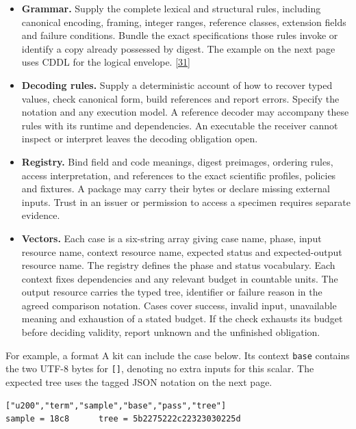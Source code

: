 \documentclass[11pt,a4paper]{article}
\newcommand{\src}[1]{\hyperlink{ref#1}{[#1]}}
\begin{document}
\begin{itemize}
\item \textbf{Grammar.} Supply the complete lexical and structural rules, including canonical encoding, framing, integer ranges, reference classes, extension fields and failure conditions. Bundle the exact specifications those rules invoke or identify a copy already possessed by digest. The example on the next page uses CDDL for the logical envelope. \src{31}
\item \textbf{Decoding rules.} Supply a deterministic account of how to recover typed values, check canonical form, build references and report errors. Specify the notation and any execution model. A reference decoder may accompany these rules with its runtime and dependencies. An executable the receiver cannot inspect or interpret leaves the decoding obligation open.
\item \textbf{Registry.} Bind field and code meanings, digest preimages, ordering rules, access interpretation, and references to the exact scientific profiles, policies and fixtures. A package may carry their bytes or declare missing external inputs. Trust in an issuer or permission to access a specimen requires separate evidence.
\item \textbf{Vectors.} Each case is a six-string array giving case name, phase, input resource name, context resource name, expected status and expected-output resource name. The registry defines the phase and status vocabulary. Each context fixes dependencies and any relevant budget in countable units. The output resource carries the typed tree, identifier or failure reason in the agreed comparison notation. Cases cover success, invalid input, unavailable meaning and exhaustion of a stated budget. If the check exhausts its budget before deciding validity, report unknown and the unfinished obligation.
\end{itemize}

For example, a format A kit can include the case below. Its context \texttt{base} contains the two UTF-8 bytes for \texttt{[]}, denoting no extra inputs for this scalar. The expected tree uses the tagged JSON notation on the next page.
\begin{small}
\begin{verbatim}
["u200","term","sample","base","pass","tree"]
sample = 18c8      tree = 5b2275222c22323030225d
\end{verbatim}
\end{small}

\clearpage
{}
\end{document}
